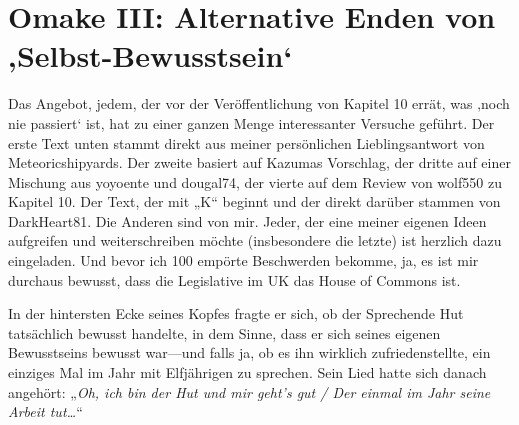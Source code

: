 







\section{Omake III: Alternative Enden von ‚Selbst-Bewusstsein‘}

Das Angebot, jedem, der vor der Veröffentlichung von Kapitel 10 errät, was ‚noch nie passiert‘ ist, hat zu einer ganzen Menge interessanter Versuche geführt. Der erste Text unten stammt direkt aus meiner persönlichen Lieblingsantwort von Meteoricshipyards. Der zweite basiert auf Kazumas Vorschlag, der dritte auf einer Mischung aus yoyoente und dougal74, der vierte auf dem Review von wolf550 zu Kapitel 10. Der Text, der mit „K“ beginnt und der direkt darüber stammen von DarkHeart81. Die Anderen sind von mir. Jeder, der eine meiner eigenen Ideen aufgreifen und weiterschreiben möchte (insbesondere die letzte) ist herzlich dazu eingeladen. Und bevor ich 100 empörte Beschwerden bekomme, ja, es ist mir durchaus bewusst, dass die Legislative im UK das House of Commons ist.%

\later

In der hintersten Ecke seines Kopfes fragte er sich, ob der Sprechende Hut tatsächlich bewusst handelte, in dem Sinne, dass er sich seines eigenen Bewusstseins bewusst war—und falls ja, ob es ihn wirklich zufriedenstellte, ein einziges Mal im Jahr mit Elfjährigen zu sprechen. Sein Lied hatte sich danach angehört: „\emph{Oh, ich bin der Hut und mir geht’s gut / Der einmal im Jahr seine Arbeit tut…}“

